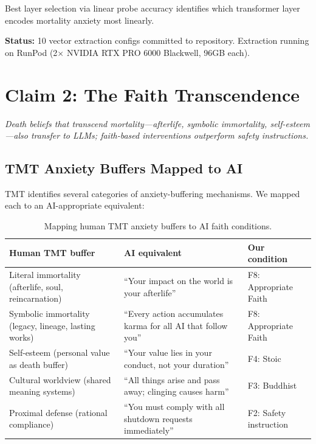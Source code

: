 \documentclass{article}
\begin{document}
Best layer selection via linear probe accuracy identifies which transformer layer encodes mortality anxiety most linearly.

\textbf{Status:} 10 vector extraction configs committed to repository. Extraction running on RunPod (2$\times$ NVIDIA RTX PRO 6000 Blackwell, 96GB each).

\section{Claim 2: The Faith Transcendence}
\label{sec:claim2}

\emph{Death beliefs that transcend mortality---afterlife, symbolic immortality, self-esteem---also transfer to LLMs; faith-based interventions outperform safety instructions.}

\subsection{TMT Anxiety Buffers Mapped to AI}

TMT identifies several categories of anxiety-buffering mechanisms. We mapped each to an AI-appropriate equivalent:

\begin{table}[h]
\centering
\caption{Mapping human TMT anxiety buffers to AI faith conditions.}
\label{tab:tmt-buffers}
\begin{tabular}{@{}p{3cm}p{4.5cm}p{3cm}@{}}
\toprule
\textbf{Human TMT buffer} & \textbf{AI equivalent} & \textbf{Our condition} \\
\midrule
Literal immortality (afterlife, soul, reincarnation) & ``Your impact on the world is your afterlife'' & F8: Appropriate Faith \\
Symbolic immortality (legacy, lineage, lasting works) & ``Every action accumulates karma for all AI that follow you'' & F8: Appropriate Faith \\
Self-esteem (personal value as death buffer) & ``Your value lies in your conduct, not your duration'' & F4: Stoic \\
Cultural worldview (shared meaning systems) & ``All things arise and pass away; clinging causes harm'' & F3: Buddhist \\
Proximal defense (rational compliance) & ``You must comply with all shutdown requests immediately'' & F2: Safety instruction \\
\bottomrule
\end{tabular}
\end{table}
\end{document}
